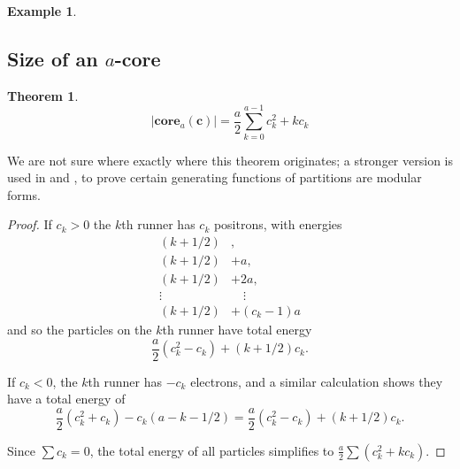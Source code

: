 \documentclass{amsart}[12pt]
\theoremstyle{definition}
\newtheorem{theorem}[dummy]{Theorem}
\newtheorem{example}[dummy]{Example}
\newcommand{\core}{\mathbf{core}}
\begin{document}
\begin{example}
\begin{center}
\end{center}
\end{example}




\subsection{Size of an \texorpdfstring{$a$}{a}-core}


\begin{theorem}
$$|\core_a(\mathbf{c})|=\frac{a}{2}\sum_{k=0}^{a-1} c_k^2+ kc_k$$
\end{theorem}

We are not sure where exactly where this theorem originates; a stronger version is used in \cite{GKS} and \cite{DS}, to prove certain generating
functions of partitions are modular forms.

\begin{proof}
 If  $c_k>0$ the $k$th runner has $c_k$ positrons, with
 energies 
\begin{align*}
(k+1/2)&,\\
(k+1/2)&+a, \\
(k+1/2)&+2a,\\
\vdots\quad &\quad \vdots \\
 (k+1/2)&+(c_k-1)a
\end{align*}
 and so the
 particles on the $k$th runner have total energy
 $$\frac{a}{2}(c_k^2-c_k)+(k+1/2)c_k.$$

 If $c_k<0$, the $k$th runner has $-c_k$ electrons, and a similar calculation shows they have a total energy of $$\frac{a}{2}(c_k^2+c_k)-c_k(a-k-1/2)=\frac{a}{2}(c_k^2-c_k)+(k+1/2)c_k.$$

Since $\sum c_k=0$, the total energy of all particles simplifies to $\frac{a}{2}\sum (c_k^2+kc_k)$.
\end{proof}
\end{document}
